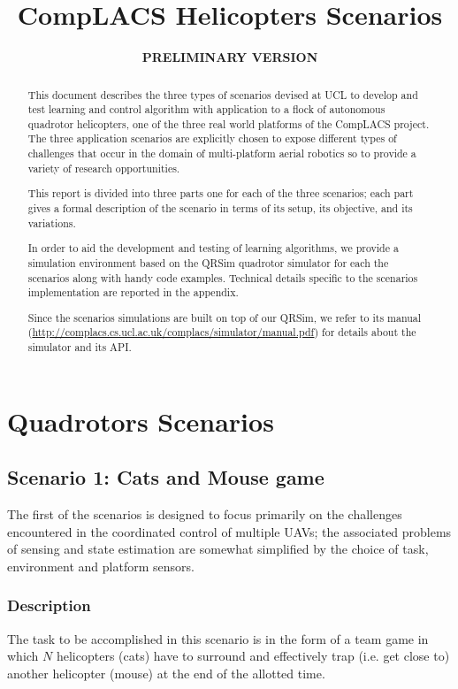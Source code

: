 \documentclass[a4paper,11pt]{report}
\title{{CompLACS} Helicopters Scenarios}
\author{\bf PRELIMINARY VERSION}
\newcommand{\sname}{QRSim\xspace}
\newcommand{\webman}{\url{http://complacs.cs.ucl.ac.uk/complacs/simulator/manual.pdf}\xspace}
\begin{document}
\maketitle



\begin{abstract}
This document describes the three types of scenarios devised at UCL to develop and test learning and control algorithm with application to a flock of autonomous quadrotor helicopters, one of the three real world platforms of the {CompLACS} project.
The three application scenarios are explicitly chosen to expose different types of challenges that occur in the domain of multi-platform aerial robotics so to provide a variety of research opportunities.

This report is divided into three parts one for each of the three scenarios; each part gives a formal description of the scenario in terms of its setup, its objective, and its variations. 

In order to aid the development and testing of learning algorithms, we provide a simulation environment based on the \sname quadrotor simulator for each the scenarios along with handy code examples.
Technical details specific to the scenarios implementation are reported in the appendix. 

Since the scenarios simulations are built on top of our \sname, we refer to its manual (\webman) for details about the simulator and its API.

\end{abstract}

\tableofcontents

\chapter{Quadrotors Scenarios}

\section{Scenario 1: Cats and Mouse game}

The first of the scenarios is designed to focus primarily on the challenges encountered in the coordinated control of multiple UAVs; the associated problems of sensing and state estimation are somewhat simplified by the choice of task, environment and platform sensors. 

\subsection{Description}
The task to be accomplished in this scenario is in the form of a team game in which $N$ helicopters (cats) have to surround and effectively trap (i.e. get close to) another helicopter (mouse) at the end of the allotted time. 
\end{document}
